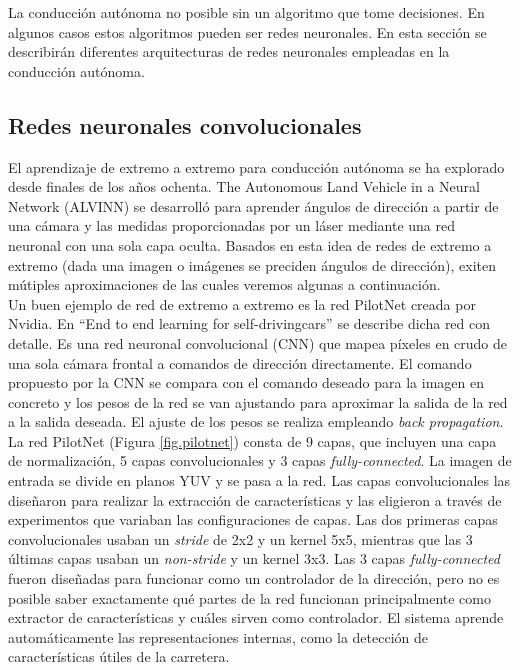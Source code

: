 La conducción autónoma no posible sin un algoritmo que tome decisiones. En algunos casos estos algoritmos pueden ser redes neuronales. En esta sección se describirán diferentes arquitecturas de redes neuronales empleadas en la conducción autónoma.


\subsection{Redes neuronales convolucionales}

El aprendizaje de extremo a extremo para conducción autónoma se ha explorado desde finales de los años ochenta. The Autonomous Land Vehicle in a Neural Network (ALVINN) \cite{alvinn} se desarrolló para aprender ángulos de dirección a partir de una cámara y las medidas proporcionadas por un láser mediante una red neuronal con una sola capa oculta. Basados en esta idea de redes de extremo a extremo (dada una imagen o imágenes se preciden ángulos de dirección), exiten mútiples aproximaciones \cite{road} \cite{end2end} \cite{interpretable} de las cuales veremos algunas a continuación.\\

Un buen ejemplo de red de extremo a extremo es la red PilotNet \cite{end2end} \cite{explaining-end2end} creada por Nvidia. En ``End to end learning for self-drivingcars'' \cite{end2end} se describe dicha red con detalle. Es una red neuronal convolucional (CNN) que mapea píxeles en crudo de una sola cámara frontal a comandos de dirección directamente. El comando propuesto por la CNN se compara con el comando deseado para la imagen en concreto y los pesos de la red se van ajustando para aproximar la salida de la red a la salida deseada. El ajuste de los pesos se realiza empleando \textit{back propagation}.\\

La red PilotNet (Figura \ref{fig.pilotnet}) consta de 9 capas, que incluyen una capa de normalización, 5 capas convolucionales y 3 capas \textit{fully-connected}. La imagen de entrada se divide en planos YUV y se pasa a la red. Las capas convolucionales las diseñaron para realizar la extracción de características y las eligieron a través de experimentos que variaban las configuraciones de capas. Las dos primeras capas convolucionales usaban un \textit{stride} de 2x2 y un kernel 5x5, mientras que las 3 últimas capas usaban un \textit{non-stride} y un kernel 3x3. Las 3 capas \textit{fully-connected} fueron diseñadas para funcionar como un controlador de la dirección, pero no es posible saber exactamente qué partes de la red funcionan principalmente como extractor de características y cuáles sirven como controlador. El sistema aprende automáticamente las representaciones internas, como la detección de características útiles de la carretera.\\

